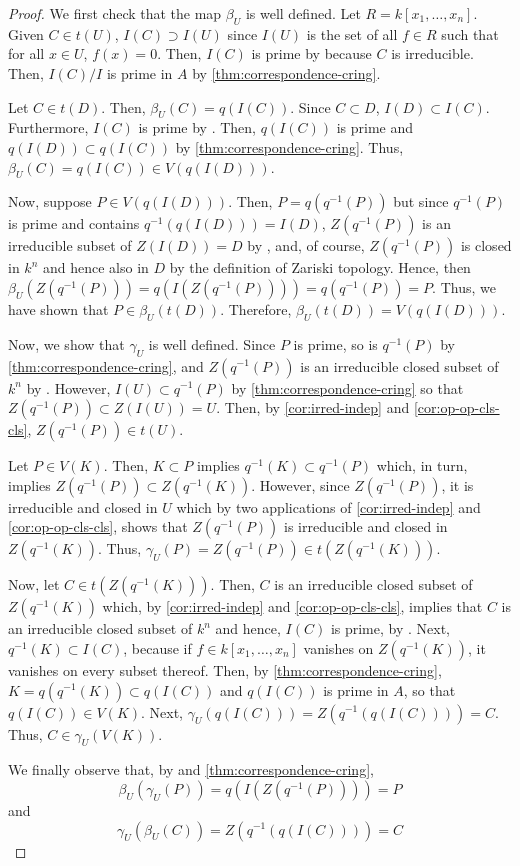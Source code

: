 \begin{proof}
We first check that the map $\beta_U$ is well defined.
Let $R = k[x_1, \dots, x_n]$.
Given $C \in t(U)$, $I(C) \supset I(U)$ since $I(U)$ is the set of all
$f \in R$ such that for all $x \in U$, $f(x) = 0$.
Then, $I(C)$ is prime by \cite[Cor. I.1.4]{HartAG} because $C$ is irreducible.
Then, $I(C)/I$ is prime in $A$ by \cref{thm:correspondence-cring}.

Let $C \in t(D)$. Then, $\beta_U(C) = q(I(C))$. Since $C \subset D$,
$I(D) \subset I(C)$. Furthermore, $I(C)$ is prime by \cite[Cor. I.1.4]{HartAG}.
Then, $q(I(C))$ is prime and $q(I(D)) \subset q(I(C))$ by
\cref{thm:correspondence-cring}. Thus, $\beta_U(C) = q(I(C)) \in V(q(I(D)))$.

Now, suppose $P \in V(q(I(D)))$. Then, $P = q(q^{-1}(P))$ but since
$q^{-1}(P)$ is prime and contains $q^{-1}(q(I(D))) = I(D)$,
$Z(q^{-1}(P))$ is an irreducible subset of $Z(I(D)) = D$
by \cite[Cor. I.1.4]{HartAG}, and, of course, $Z(q^{-1}(P))$ is closed
in $k^n$ and hence also in $D$ by the definition of Zariski topology.
Hence, then $\beta_U(Z(q^{-1}(P))) = q(I(Z(q^{-1}(P)))) = q(q^{-1}(P)) = P$.
Thus, we have shown that $P \in \beta_U(t(D))$. Therefore,
$\beta_U(t(D)) = V(q(I(D)))$.

Now, we show that $\gamma_U$ is well defined. Since $P$ is prime,
so is $q^{-1}(P)$ by \cref{thm:correspondence-cring}, and
$Z(q^{-1}(P))$ is an irreducible closed subset of $k^n$
by \cite[Cor. I.1.4]{HartAG}. However, $I(U) \subset q^{-1}(P)$
by \cref{thm:correspondence-cring} so that $Z(q^{-1}(P)) \subset Z(I(U)) = U$.
Then, by \cref{cor:irred-indep} and \cref{cor:op-op-cls-cls},
$Z(q^{-1}(P)) \in t(U)$.

Let $P \in V(K)$. Then, $K \subset P$ implies $q^{-1}(K) \subset q^{-1}(P)$
which, in turn, implies $Z(q^{-1}(P)) \subset Z(q^{-1}(K))$. However,
since $Z(q^{-1}(P))$, it is irreducible and closed in
$U$ which by two applications of \cref{cor:irred-indep} and
\cref{cor:op-op-cls-cls}, shows that $Z(q^{-1}(P))$ is
irreducible and closed in $Z(q^{-1}(K))$. Thus,
$\gamma_U(P) = Z(q^{-1}(P)) \in t(Z(q^{-1}(K)))$.

Now, let $C \in t(Z(q^{-1}(K)))$. Then, $C$ is an irreducible
closed subset of $Z(q^{-1}(K))$ which, by \cref{cor:irred-indep}
and \cref{cor:op-op-cls-cls}, implies that $C$ is an irreducible
closed subset of $k^n$ and hence, $I(C)$ is prime, by
\cite[Cor. I.1.4]{HartAG}. Next, $q^{-1}(K) \subset I(C)$,
because if $f \in k[x_1, \dots, x_n]$ vanishes on $Z(q^{-1}(K))$,
it vanishes on every subset thereof.
Then, by \cref{thm:correspondence-cring},
$K = q(q^{-1}(K)) \subset q(I(C))$ and $q(I(C))$ is prime in $A$, so that
$q(I(C)) \in V(K)$. Next, $\gamma_U(q(I(C))) = Z(q^{-1}(q(I(C)))) = C$.
Thus, $C \in \gamma_U(V(K))$.

We finally observe that, by \cite[Cor. I.1.4]{HartAG} and
\cref{thm:correspondence-cring},
\[
\beta_U(\gamma_U(P)) = q(I(Z(q^{-1}(P)))) = P
\]
and
\[
\gamma_U(\beta_U(C)) = Z(q^{-1}(q(I(C)))) = C
\]
\end{proof}

